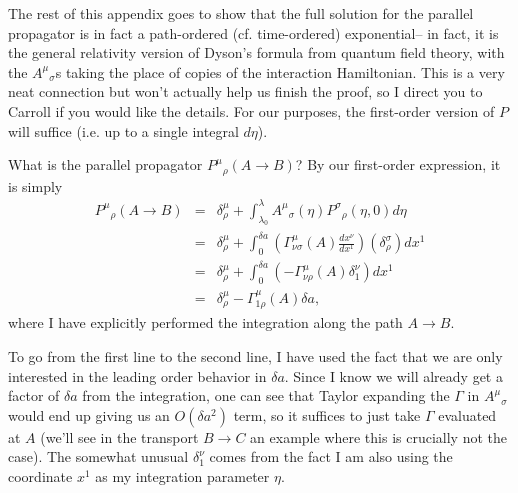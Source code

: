 The rest of this appendix goes to show that the full solution for the parallel propagator is in fact a path-ordered (cf. time-ordered) exponential-- in fact, it is the general relativity version of Dyson's formula from quantum field theory, with the ${A^\mu}_\sigma$s taking the place of copies of the interaction Hamiltonian. This is a very neat connection but won't actually help us finish the proof, so I direct you to Carroll if you would like the details. For our purposes, the first-order version of $P$ will suffice (i.e. up to a single integral $d\eta$).

What is the parallel propagator ${P^\mu}_\rho(A\to B)$? By our first-order expression, it is simply
\begin{eqnarray*}
{P^\mu}_\rho (A \to B)&=& \delta^\mu_\rho+ \int_{\lambda_0}^{\lambda} {A^\mu}_\sigma(\eta){P^\sigma}_\rho(\eta,0)d\eta\\
&=& \delta^\mu_\rho+ \int_{0}^{\delta a} \left(\Gamma^\mu_{\nu \sigma}(A) \frac{dx^\nu}{dx^1}\right) (\delta^\sigma_\rho) dx^1\\
&=&\delta^\mu_\rho +\int_0^{\delta a}(-\Gamma^\mu_{\nu \rho}(A) \delta^\nu_1) dx^1\\
&=&\delta^\mu_\rho -\Gamma^\mu_{1\rho}(A) \delta a,
\end{eqnarray*}
where I have explicitly performed the integration along the path $A\to B$. 

To go from the first line to the second line, I have used the fact that we are only interested in the leading order behavior in $\delta a$. Since I know we will already get a factor of $\delta a$ from the integration, one can see that Taylor expanding the $\Gamma$ in ${A^\mu}_\sigma$ would end up giving us an $O(\delta a^2)$ term, so it suffices to just take $\Gamma$ evaluated at $A$ (we'll see in the transport $B\to C$ an example where this is crucially not the case). The somewhat unusual $\delta^\nu_1$ comes from the fact I am also using the coordinate $x^1$ as my integration parameter $\eta$.

